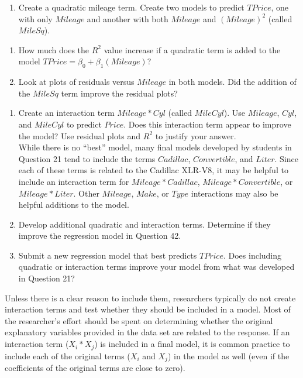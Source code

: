 \documentclass[
]{report}
\providecommand{\tightlist}{%
  \setlength{\itemsep}{0pt}\setlength{\parskip}{0pt}}
\theoremstyle{definition}
\theoremstyle{definition}
\theoremstyle{definition}
\theoremstyle{definition}
\theoremstyle{remark}
\begin{document}
\begin{enumerate}
\def\labelenumi{\arabic{enumi}.}
\setcounter{enumi}{40}
\tightlist
\item
  Create a quadratic mileage term. Create two models to predict \(TPrice\), one with only \(Mileage\) and another with both \(Mileage\) and \((Mileage)^2\) (called \(MileSq\)).
\end{enumerate}

\begin{enumerate}
\def\labelenumi{\alph{enumi}.}
\tightlist
\item
  How much does the \(R^2\) value increase if a quadratic term is added to the model \(TPrice = \beta_0 + \beta_1(Mileage)\)?
\item
  Look at plots of residuals versus \(Mileage\) in both models. Did the addition of the \(MileSq\) term improve the residual plots?
\end{enumerate}

\begin{enumerate}
\def\labelenumi{\arabic{enumi}.}
\setcounter{enumi}{41}
\item
  Create an interaction term \(Mileage*Cyl\) (called \(MileCyl\)). Use \(Mileage\), \(Cyl\), and \(MileCyl\) to predict \(Price\). Does this interaction term appear to improve the model? Use residual plots and \(R^2\) to justify your answer.\\
  While there is no ``best'' model, many final models developed by students in Question 21 tend to include the terms \(Cadillac\), \(Convertible\), and \(Liter\). Since each of these terms is related to the Cadillac XLR-V8, it may be helpful to include an interaction term for \(Mileage*Cadillac\), \(Mileage*Convertible\), or \(Mileage*Liter\). Other \(Mileage\), \(Make\), or \(Type\) interactions may also be helpful additions to the model.
\item
  Develop additional quadratic and interaction terms. Determine if they improve the regression model in Question 42.
\item
  Submit a new regression model that best predicts \(TPrice\). Does including quadratic or interaction terms improve your model from what was developed in Question 21?
\end{enumerate}

Unless there is a clear reason to include them, researchers typically do not create interaction terms and test whether they should be included in a model. Most of the researcher's effort should be spent on determining whether the original explanatory variables provided in the data set are related to the response. If an interaction term (\(X_i * X_j\)) is included in a final model, it is common practice to include each of the original terms (\(X_i\) and \(X_j\)) in the model as well (even if the coefficients of the original terms are close to zero).
\end{document}
